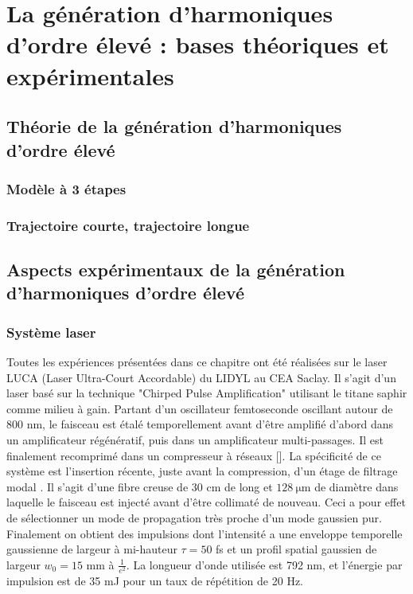 \part{La génération d'harmoniques d'ordre élevé : bases théoriques et expérimentales}
\chapter{Théorie de la génération d'harmoniques d'ordre élevé}
\section{Modèle à 3 étapes}
\section{Trajectoire courte, trajectoire longue}
\label{sec:thTraj}

\chapter{Aspects expérimentaux de la génération d'harmoniques d'ordre élevé}
\label{Sec:HHG_G}
\section{Système laser}
Toutes les expériences présentées dans ce chapitre ont été réalisées sur le laser LUCA (Laser Ultra-Court Accordable) du LIDYL au CEA Saclay. Il s'agit d'un laser basé sur la technique "Chirped Pulse Amplification" utilisant le titane saphir comme milieu à gain. Partant d'un oscillateur femtoseconde oscillant autour de 800 nm, le faisceau est étalé temporellement avant d'être amplifié d'abord dans un amplificateur régénératif, puis dans un amplificateur multi-passages. Il est finalement recomprimé dans un compresseur à réseaux []. La spécificité de ce système est l'insertion récente, juste avant la compression, d'un étage de filtrage modal . Il s'agit d'une fibre creuse de 30 cm de long et $\SI{128}{\micro\metre}$ de diamètre dans laquelle le faisceau est injecté avant d'être collimaté de nouveau. Ceci a pour effet de sélectionner un mode de propagation très proche d'un mode gaussien pur. Finalement on obtient des impulsions dont l'intensité a une enveloppe temporelle gaussienne de largeur à mi-hauteur $\tau = 50$ fs et un profil spatial gaussien de largeur $w_0 = 15$ mm à $\frac{1}{e^2}$. La longueur d'onde utilisée est 792 nm, et l'énergie par impulsion est de 35 mJ pour un taux de répétition de 20 Hz. 


